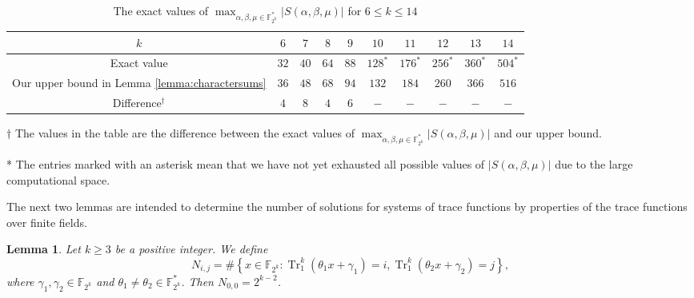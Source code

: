 \documentclass[preprint,10pt]{elsarticle}
\newcommand{\F}{\mathbb{F}}
\newcommand{\0}{\textbf{0}}
\newcommand{\1}{\textbf{1}}
\newcommand{\TRACE}{\operatorname{Tr}_1^k}
\theoremstyle{plain}
\newtheorem{lemma}{Lemma}
\begin{document}
    \begin{table}
        \centering
        \caption{The exact values of $\max_{\alpha,\beta,\mu\in\F_{2^k}^*}|S(\alpha,\beta,\mu)|$ for $6\le k\le 14$}
        \begin{threeparttable}
            \begin{tabular}{|c|c|c|c|c|c|c|c|c|c|}
                \hline
                $k$ &$6$ &  $ 7 $ & $ 8 $     & $ 9 $     & $  10 $ & $11$ &$12$ &$13$ &$14$\\  \hline 
                Exact value  &  $32$  & $40$ & $64$ &$88$  &$128^*$ &$176^*$ &$256^*$ & $360^*$ & $504^*$\\ \hline
                Our upper bound in Lemma \ref{lemma:charactersums}& $36$  & $48$ & $68$ & $94$ & $132$ & $184$& $260$ & $366$ & $516$\\ \hline
                Difference$^{\dagger}$ & $4$ & $8$& $4$& $6$ &$-$ &$-$ &$-$&$-$ &$-$ \\ \hline
            \end{tabular}
            \begin{tablenotes}
                \footnotesize
                \item[$\dagger$]  The values in the table are the difference between the exact values of $\max_{\alpha,\beta,\mu\in\F_{2^k}^*}|S(\alpha,\beta,\mu)|$ and our upper bound.
                \item[*] The entries marked with an asterisk mean that we have not yet exhausted all possible values of $|S(\alpha,\beta,\mu)|$ due to the large computational space.
            \end{tablenotes}
        \end{threeparttable}
        \label{table:Lemma6table}
    \end{table}


    The next two lemmas are intended to determine the number of solutions for systems of trace functions by properties of the trace functions over finite fields.
    \begin{lemma}\label{lemma:N_ij_trace}
        Let $k\ge 3$ be a positive integer.  We define
        \[ N_{i,j} =\#\left\{x\in\F_{2^k} : \TRACE\left(\theta_1x+\gamma_1\right)=i,\TRACE\left(\theta_2x+\gamma_2\right)=j\right\}, \]
        where  $\gamma_1,\gamma_2\in\F_{2^k}$ and $\theta_1\ne\theta_2\in\F_{2^k}^*$. Then $N_{0,0} =2^{k-2}$.
    \end{lemma}
\end{document}
